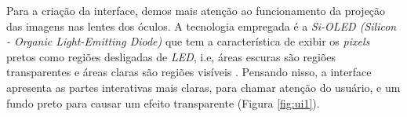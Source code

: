 Para a criação da interface, demos mais atenção ao funcionamento da projeção das imagens nas lentes dos óculos. A tecnologia empregada é a \textit{Si-OLED (Silicon - Organic Light-Emitting Diode)} que tem a característica de exibir os \textit{pixels} pretos como regiões desligadas de \textit{LED}, i.e, áreas escuras são regiões transparentes e áreas claras são regiões visíveis \cite{oculosspecs}. Pensando nisso, a interface apresenta as partes interativas mais claras, para chamar atenção do usuário, e um fundo preto para causar um efeito transparente (Figura \ref{fig:ui1}).


